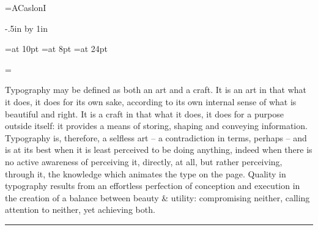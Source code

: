 
%

\newtoks\dspfont
\dspfont={ACaslonI} 

\def\fontname{Adobe Caslon Italic}

\def\comment{Carol Twombly}

\parindent0pt
\nopagenumbers
\voffset-.5in
\advance\vsize by 1in

\font\text=\the\dspfont\space at 10pt
\font\tiny=\the\dspfont\space at 8pt
\font\name=\the\dspfont\space at 24pt

\newtoks\ntext
\newtoks\pantext
\newtoks\loremtext
%
\newbox\testbox 
%
\newdimen\bigger 
\newdimen\dspsize 
\newdimen\dspsizeincr 
\newdimen\habcwd
\newdimen\ctextsz
\newdimen\leading 
\newdimen\xheight 
\newdimen\ascheight
\newdimen{} 
\newdimen{}
\newdimen\adjust  {} 
\newdimen\dist
\newdimen\scratchdim
%
\newcount\dsplineno
\newcount\picawd
\newcount\pointwd
\newcount\spconv
\newcount\measure 
\newcount\divisor 
\newcount\scratch
\newcount\sscratch
\newcount\xascrnum
\newcount\intgp
\newcount\fracp
\newcount\scppt {}

\ntext={Typography may be defined as both
an art and a craft. It is an art in that what it does, it does for its
own sake, according to its own internal sense of what is beautiful and
right. It is a craft in that what it does, it does for a purpose
outside itself: it provides a means of storing, shaping and conveying
information. Typography is, therefore, a selfless art -- a
contradiction in terms, perhaps -- and is at its best when it is least
perceived to be doing anything, indeed when there is no active
awareness of perceiving it, directly, at all, but rather perceiving,
through it, the knowledge which animates the type on the page. Quality
in typography results from an effortless perfection of conception and
execution in the creation of a balance between beauty \& utility:
compromising neither, calling attention to neither, yet achieving
both.\thinspace\nobreak\leaders\hrule\hfill\null\par}

